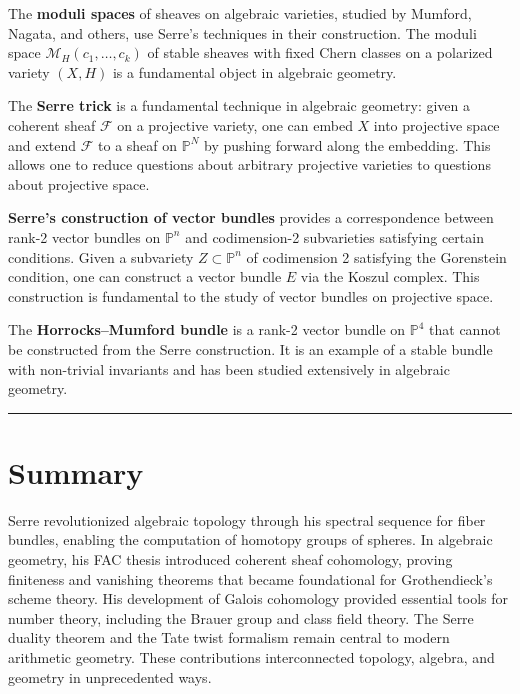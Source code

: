 The \textbf{moduli spaces} of sheaves on algebraic varieties, studied by Mumford, Nagata, and others, use Serre's techniques in their construction. The moduli space $\mathcal{M}_H(c_1, \ldots, c_k)$ of stable sheaves with fixed Chern classes on a polarized variety $(X, H)$ is a fundamental object in algebraic geometry.

The \textbf{Serre trick} is a fundamental technique in algebraic geometry: given a coherent sheaf $\mathcal{F}$ on a projective variety, one can embed $X$ into projective space and extend $\mathcal{F}$ to a sheaf on $\mathbb{P}^N$ by pushing forward along the embedding. This allows one to reduce questions about arbitrary projective varieties to questions about projective space.

\textbf{Serre's construction of vector bundles} provides a correspondence between rank-2 vector bundles on $\mathbb{P}^n$ and codimension-2 subvarieties satisfying certain conditions. Given a subvariety $Z \subset \mathbb{P}^n$ of codimension 2 satisfying the Gorenstein condition, one can construct a vector bundle $E$ via the Koszul complex. This construction is fundamental to the study of vector bundles on projective space.

The \textbf{Horrocks--Mumford bundle} is a rank-2 vector bundle on $\mathbb{P}^4$ that cannot be constructed from the Serre construction. It is an example of a stable bundle with non-trivial invariants and has been studied extensively in algebraic geometry.

\begin{center}\rule{0.5\linewidth}{0.5pt}\end{center}

\section*{Summary}

Serre revolutionized algebraic topology through his spectral sequence for fiber bundles, enabling the computation of homotopy groups of spheres. In algebraic geometry, his FAC thesis introduced coherent sheaf cohomology, proving finiteness and vanishing theorems that became foundational for Grothendieck's scheme theory. His development of Galois cohomology provided essential tools for number theory, including the Brauer group and class field theory. The Serre duality theorem and the Tate twist formalism remain central to modern arithmetic geometry. These contributions interconnected topology, algebra, and geometry in unprecedented ways.
